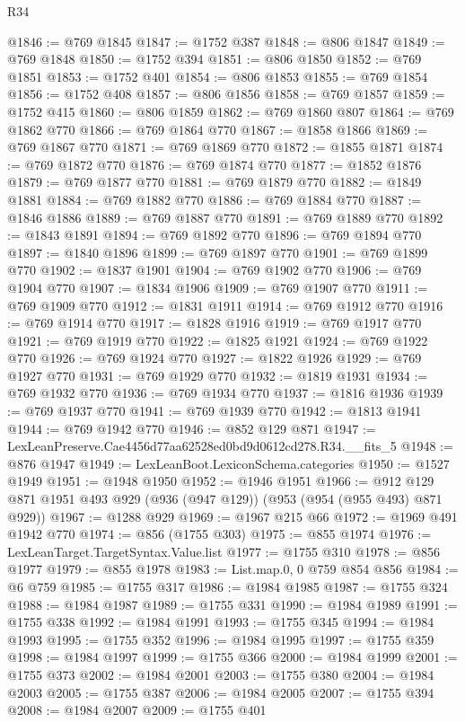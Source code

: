 \begin{lexlean}{R34}
\begin{coremodule}
@1846 := @769 @1845
@1847 := @1752 @387
@1848 := @806 @1847
@1849 := @769 @1848
@1850 := @1752 @394
@1851 := @806 @1850
@1852 := @769 @1851
@1853 := @1752 @401
@1854 := @806 @1853
@1855 := @769 @1854
@1856 := @1752 @408
@1857 := @806 @1856
@1858 := @769 @1857
@1859 := @1752 @415
@1860 := @806 @1859
@1862 := @769 @1860 @807
@1864 := @769 @1862 @770
@1866 := @769 @1864 @770
@1867 := @1858 @1866
@1869 := @769 @1867 @770
@1871 := @769 @1869 @770
@1872 := @1855 @1871
@1874 := @769 @1872 @770
@1876 := @769 @1874 @770
@1877 := @1852 @1876
@1879 := @769 @1877 @770
@1881 := @769 @1879 @770
@1882 := @1849 @1881
@1884 := @769 @1882 @770
@1886 := @769 @1884 @770
@1887 := @1846 @1886
@1889 := @769 @1887 @770
@1891 := @769 @1889 @770
@1892 := @1843 @1891
@1894 := @769 @1892 @770
@1896 := @769 @1894 @770
@1897 := @1840 @1896
@1899 := @769 @1897 @770
@1901 := @769 @1899 @770
@1902 := @1837 @1901
@1904 := @769 @1902 @770
@1906 := @769 @1904 @770
@1907 := @1834 @1906
@1909 := @769 @1907 @770
@1911 := @769 @1909 @770
@1912 := @1831 @1911
@1914 := @769 @1912 @770
@1916 := @769 @1914 @770
@1917 := @1828 @1916
@1919 := @769 @1917 @770
@1921 := @769 @1919 @770
@1922 := @1825 @1921
@1924 := @769 @1922 @770
@1926 := @769 @1924 @770
@1927 := @1822 @1926
@1929 := @769 @1927 @770
@1931 := @769 @1929 @770
@1932 := @1819 @1931
@1934 := @769 @1932 @770
@1936 := @769 @1934 @770
@1937 := @1816 @1936
@1939 := @769 @1937 @770
@1941 := @769 @1939 @770
@1942 := @1813 @1941
@1944 := @769 @1942 @770
@1946 := @852 @129 @871
@1947 := LexLeanPreserve.Cae4456d77aa62528ed0bd9d0612cd278.R34.__fits_5
@1948 := @876 @1947
@1949 := LexLeanBoot.LexiconSchema.categories
@1950 := @1527 @1949
@1951 := @1948 @1950
@1952 := @1946 @1951
@1966 := @912 @129 @871 @1951 @493 @929 (@936 (@947 @129)) (@953 (@954 (@955 @493) @871 @929))
@1967 := @1288 @929
@1969 := @1967 @215 @66
@1972 := @1969 @491 @1942 @770
@1974 := @856 (@1755 @303)
@1975 := @855 @1974
@1976 := LexLeanTarget.TargetSyntax.Value.list
@1977 := @1755 @310
@1978 := @856 @1977
@1979 := @855 @1978
@1983 := List.map.{0, 0} @759 @854 @856
@1984 := @6 @759
@1985 := @1755 @317
@1986 := @1984 @1985
@1987 := @1755 @324
@1988 := @1984 @1987
@1989 := @1755 @331
@1990 := @1984 @1989
@1991 := @1755 @338
@1992 := @1984 @1991
@1993 := @1755 @345
@1994 := @1984 @1993
@1995 := @1755 @352
@1996 := @1984 @1995
@1997 := @1755 @359
@1998 := @1984 @1997
@1999 := @1755 @366
@2000 := @1984 @1999
@2001 := @1755 @373
@2002 := @1984 @2001
@2003 := @1755 @380
@2004 := @1984 @2003
@2005 := @1755 @387
@2006 := @1984 @2005
@2007 := @1755 @394
@2008 := @1984 @2007
@2009 := @1755 @401

\end{coremodule}
\end{lexlean}
